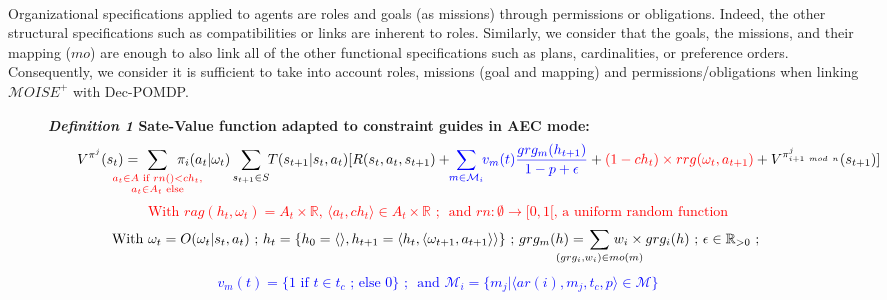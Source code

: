 \documentclass[sigconf]{aamas}
\begin{document}
\

\noindent Organizational specifications applied to agents are roles and goals (as missions) through permissions or obligations. Indeed, the other structural specifications such as compatibilities or links are inherent to roles. Similarly, we consider that the goals, the missions, and their mapping ($mo$) are enough to also link all of the other functional specifications such as plans, cardinalities, or preference orders.
Consequently, we consider it is sufficient to take into account roles, missions (goal and mapping) and permissions/obligations when linking $\mathcal{M}OISE^+$ with Dec-POMDP. 

\begin{figure}[t]
    \label{eq:single_value_function}
    \raggedright
    \textbf{\textit{Definition 1} \quad Sate-Value function adapted to constraint guides in AEC mode:}
    \begin{gather*}
      \text{\quad \quad} V^{\pi^j}(s_t) = \hspace{-0.75cm} \sum_{\textcolor{red}{ \substack{a_{t} \in A \text{ if } rn() < ch_{t}, \\ 
      a_{t} \in A_{t} \text{ else}}
      }}{\hspace{-0.7cm} \pi_i(a_{t} | \omega_t)} \sum_{s_{t+1} \in S}{\hspace{-0.1cm} T(s_{t+1} | s_t, a_{t})[R(s_t,a_{t},s_{t+1}) + \hspace{-0.1cm} \textcolor{blue}{ \sum_{m \in \mathcal{M}_i}{ \hspace{-0.1cm} v_m(t) \frac{grg_m(h_{t+1})}{1 - p + \epsilon} } } + \textcolor{red}{(1-ch_t) \times rrg(\omega_t,a_{t+1})} + V^{\pi^j_{i+1 \ mod \ n}}(s_{t+1})]}
    \end{gather*}  
    \textcolor{red}{\[\text{With } rag(h_t, \omega_t) = A_{t} \times \mathbb{R} \text{, } \langle a_t, ch_{t} \rangle \in A_{t} \times \mathbb{R} \text{ ; } \text{ and } rn: \emptyset \to [0,1[ \text{, a uniform random function}\]}
    \vspace{-0.5cm}
    \textcolor{blue}{
    \begin{gather*}
    \text{With } \omega_t = O(\omega_t | s_t, a_t) \text{ ; } h_t = \{h_0 = \langle \rangle, h_{t+1} = \langle h_t, \langle \omega_{t+1}, a_{t+1} \rangle \rangle \} \text{ ; } grg_m(h) = \hspace{-0.8cm} \sum_{(grg_i,w_i) \in mo(m)}{\hspace{-0.8cm} w_i \times grg_i(h)} \text{ ; } \epsilon \in \mathbb{R}_{>0} \text{ ; }
    \end{gather*}
    }
    \vspace{-0.75cm}
    \textcolor{blue}{
    \begin{gather*}
    v_m(t) = \{ 1 \text{ if } t \in t_c \text{ ; else } 0 \} \text{ ; } \text{ and } \mathcal{M}_i = \{m_j | \langle ar(i),m_j,t_c,p \rangle \in \mathcal{M}\}
    \end{gather*}
    }
    \vspace{-0.6cm}
\end{figure}
\end{document}
